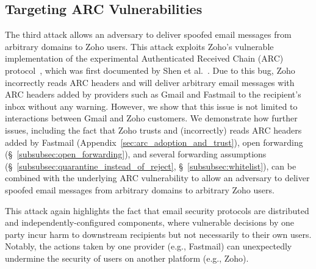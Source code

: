 \subsection{Targeting ARC Vulnerabilities}
\label{subsec:attack_zoho_arc}
The third attack allows an adversary to deliver spoofed email messages
from arbitrary domains to Zoho users.  This attack exploits Zoho's
vulnerable implementation of the experimental Authenticated Received
Chain (ARC) protocol~\cite{ARCSpeci1:online}, which was first
documented by Shen et al.~\cite{shen2020weak}. Due to this bug, Zoho
incorrectly reads ARC headers and will deliver arbitrary email
messages with ARC headers added by providers such as Gmail and
Fastmail to the recipient's inbox without any warning.  However, we
show that this issue is not limited to interactions between Gmail and
Zoho customers.  We demonstrate how further issues, including the fact that
Zoho trusts and (incorrectly) reads ARC headers added by Fastmail
(Appendix~\ref{sec:arc_adoption_and_trust}), open forwarding
(\S~\ref{subsubsec:open_forwarding}), and several forwarding
assumptions (\S~\ref{subsubsec:quarantine_instead_of_reject},
\S~\ref{subsubsec:whitelist}), can be combined with the underlying ARC
vulnerability to allow an adversary to deliver spoofed email messages
from arbitrary domains to arbitrary Zoho users.

This attack again highlights the fact that email security protocols
are distributed and independently-configured components, where
vulnerable decisions by one party incur harm to downstream recipients
but not necessarily to their own users.  Notably, the actions taken
by one provider (e.g., Fastmail) can unexpectedly undermine the
security of users on another platform (e.g., Zoho).




